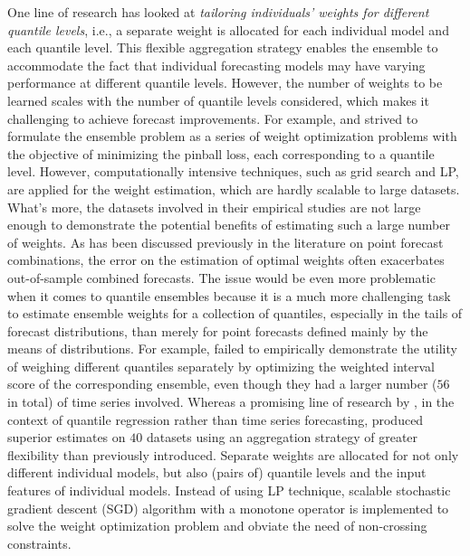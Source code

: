 \documentclass[11pt]{article}
\begin{document}
One line of research has looked at \textit{tailoring individuals' weights for different quantile levels}, i.e., a separate weight is allocated for each individual model and each quantile level. This flexible aggregation strategy enables the ensemble to accommodate the fact that individual forecasting models may have varying performance at different quantile levels. However, the number of weights to be learned scales with the number of quantile levels considered, which makes it challenging to achieve forecast improvements. For example, \cite{Wang2019-lx} and \cite{Browell2020-pa} strived to formulate the ensemble problem as a series of weight optimization problems with the objective of minimizing the pinball loss, each corresponding to a quantile level. However, computationally intensive techniques, such as grid search and LP, are applied for the weight estimation, which are hardly scalable to large datasets. What's more, the datasets involved in their empirical studies are not large enough to demonstrate the potential benefits of estimating such a large number of weights. As has been discussed previously in the literature on point forecast combinations, the error on the estimation of optimal weights often exacerbates out-of-sample combined forecasts. The issue would be even more problematic when it comes to quantile ensembles because it is a much more challenging task to estimate ensemble weights for a collection of quantiles, especially in the tails of forecast distributions, than merely for point forecasts defined mainly by the means of distributions. For example, \cite{Brooks2020-sg} failed to empirically demonstrate the utility of weighing different quantiles separately by optimizing the weighted interval score \citep[WIS,][]{Bracher2021-hx} of the corresponding ensemble, even though they had a larger number ($56$ in total) of time series involved. Whereas a promising line of research by \cite{Kim2021-wa}, in the context of quantile regression rather than time series forecasting, produced superior estimates on $40$ datasets using an aggregation strategy of greater flexibility than previously introduced. Separate weights are allocated for not only different individual models, but also (pairs of) quantile levels and the input features of individual models. Instead of using LP technique, scalable stochastic gradient descent (SGD) algorithm with a monotone operator is implemented to solve the weight optimization problem and obviate the need of non-crossing constraints.
\end{document}
